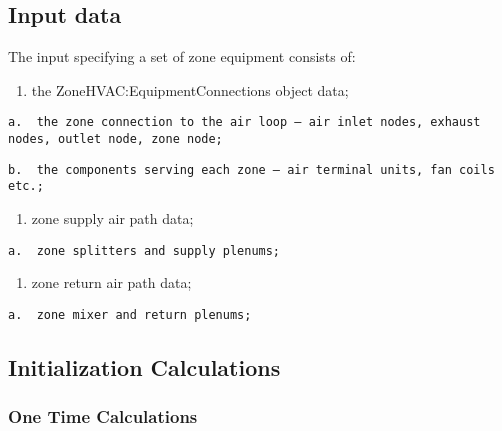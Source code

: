 \subsection{Input data}\label{input-data-000}

The input specifying a set of zone equipment consists of:

\begin{enumerate}
\def\labelenumi{\arabic{enumi}.}
\tightlist
\item
  the ZoneHVAC:EquipmentConnections object data;
\end{enumerate}

\begin{lstlisting}
a.  the zone connection to the air loop – air inlet nodes, exhaust nodes, outlet node, zone node;
\end{lstlisting}

\begin{lstlisting}
b.  the components serving each zone – air terminal units, fan coils etc.;
\end{lstlisting}

\begin{enumerate}
\def\labelenumi{\arabic{enumi}.}
\setcounter{enumi}{1}
\tightlist
\item
  zone supply air path data;
\end{enumerate}

\begin{lstlisting}
a.  zone splitters and supply plenums;
\end{lstlisting}

\begin{enumerate}
\def\labelenumi{\arabic{enumi}.}
\setcounter{enumi}{2}
\tightlist
\item
  zone return air path data;
\end{enumerate}

\begin{lstlisting}
a.  zone mixer and return plenums;
\end{lstlisting}

\subsection{Initialization Calculations}\label{initialization-calculations-000}

\subsubsection{One Time Calculations}\label{one-time-calculations-000}

